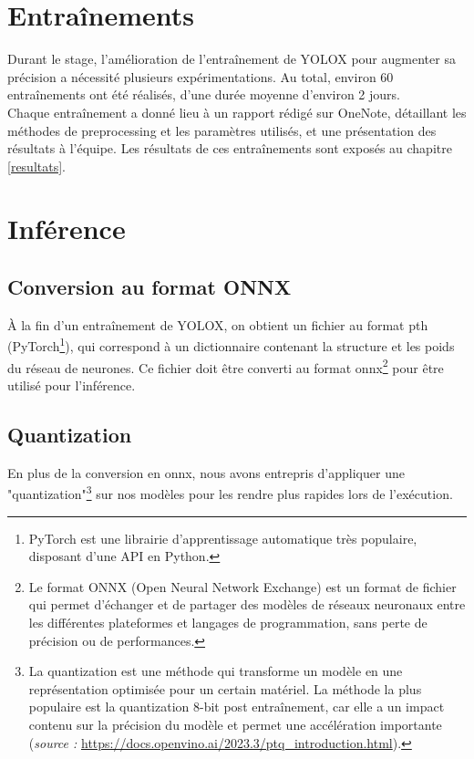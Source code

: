 \section{Entraînements}

Durant le stage, l'amélioration de l'entraînement de YOLOX pour augmenter sa précision
a nécessité plusieurs expérimentations. Au total, environ 60 entraînements ont été réalisés,
d'une durée moyenne d'environ 2 jours. \\

Chaque entraînement a donné lieu à un rapport rédigé sur OneNote, détaillant les méthodes de preprocessing et les paramètres utilisés, et une présentation des
résultats à l'équipe. Les résultats de ces entraînements sont exposés au chapitre \ref{resultats}.

\section{Inférence}

\subsection{Conversion au format ONNX}

À la fin d'un entraînement de YOLOX, on obtient un fichier au format pth (PyTorch\footnote{PyTorch est une librairie d'apprentissage automatique très populaire, disposant d'une API en Python.}),
qui correspond à un dictionnaire contenant la structure et les poids du réseau de neurones.
Ce fichier doit être converti au format onnx\footnote{
Le format ONNX (Open Neural Network Exchange) est un format de fichier qui permet d'échanger
et de partager des modèles de réseaux neuronaux entre les différentes plateformes et
langages de programmation, sans perte de précision ou de performances.}
pour être utilisé pour l'inférence.\\

\subsection{Quantization}

En plus de la conversion en onnx, nous avons entrepris d'appliquer une
"quantization"\footnote{La quantization est une méthode qui transforme un modèle en une représentation
optimisée pour un certain matériel. La méthode la plus populaire est la quantization
8-bit post entraînement, car elle a un impact contenu sur la précision du modèle
et permet une accélération importante (\textit{source : }
\url{https://docs.openvino.ai/2023.3/ptq_introduction.html}).}
sur nos modèles pour les rendre plus rapides lors de l'exécution.\\

